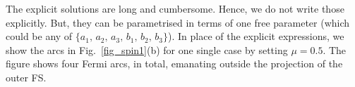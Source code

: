 \documentclass[aps,prb,onecolumn, footinbib, 10pt]{revtex4-2}
\def \nn{\nonumber \\}
\begin{document}
The explicit solutions are long and cumbersome. Hence, we do not write those explicitly. But, they can be parametrised in terms of one free parameter (which could be any of $\lbrace a_1, \, a_2, \, a_3, \,b_1, \, b_2, \,b_3 \rbrace $). In place of the explicit expressions, we show the arcs in Fig.~\ref{fig_spin1}(b) for one single case by setting $\mu=0.5$. The figure shows four Fermi arcs, in total, emanating outside the projection of the outer FS.


%
\end{document}
